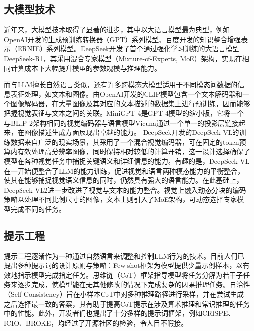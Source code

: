 \subsection{大模型技术}
近年来，大模型技术取得了显著的进步，其中以大语言模型最为典型，例如OpenAI开发的生成预训练转换器（GPT）系列模型、百度开发的知识整合增强表示（ERNIE）系列模型。DeepSeek开发了首个通过强化学习训练的大语言模型 DeepSeek-R1，其采用混合专家模型（Mixture-of-Experts, MoE）架构，实现在相同计算成本下大幅提升模型的参数规模与推理能力。

而与LLM擅长自然语言类似，还有许多跨模态大模型适用于不同模态间数据的信息表征处理，如文本和图像。由OpenAI开发的CLIP模型包含一个文本解码器和一个图像解码器，在大量图像及其对应的文本描述的数据集上进行预训练，因而能够把握视觉表征与文本之间的关联。MiniGPT-4是GPT-4模型的缩小版，它将一个与BLIP-2架构相同的视觉编码器与语言模型Vicuna通过一个单一的投影层链接起来，在图像描述生成方面展现出卓越的能力。
DeepSeek开发的DeepSeek-VL的训练数据来自广泛的现实场景，其采用了一个混合视觉编码器，可在固定的token预算内有效处理高分辨率图像，同时保持相对较低的计算开销，这一设计选择确保了模型在各种视觉任务中捕捉关键语义和详细信息的能力。有趣的是，DeepSeek-VL在一开始便整合了LLM的能力训练，促进视觉和语言两种模态能力的平衡整合，使其在能够捕捉视觉语义信息的同时，仍然具有强大的语言能力。在此基础上，DeepSeek-VL2进一步改进了视觉与文本的能力整合。视觉上融入动态分块的编码策略以处理不同比例尺寸的图像，文本上则引入了MoE架构，可动态选择专家模型完成不同的任务。

\subsection{提示工程}
提示工程逐渐作为一种通过自然语言来调整和控制LLM行为的技术。目前人们已提出多种提示词的设计原则与策略：Few-shot框架为模型提供少量示例样本，以有效地指示模型完成指定任务。思维链（CoT）框架指导模型将任务分解为若干子任务来逐步完成，使模型能在无其他修改的情况下完成复杂的因果推理任务。自洽性（Self-Consistency）旨在小样本CoT中对多种推理路径进行采样，并在尝试生成之后选择最一致的答案，其有助于提高CoT提示在涉及算术推理和常识推理的任务中的性能。此外，开发者们也提出了十分多样的提示词框架，例如CRISPE、ICIO、BROKE，均经过了开源社区的检验，令人目不暇接。


